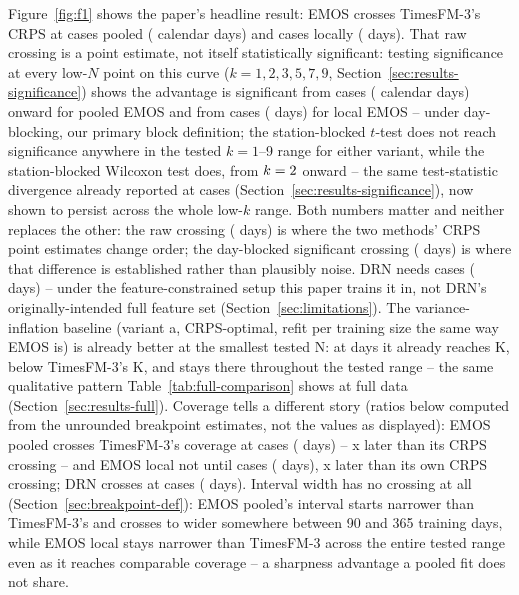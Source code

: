 Figure~\ref{fig:f1} shows the paper's headline result: EMOS crosses
TimesFM-3's CRPS at \BpCrpsPooledCases{} cases pooled
(\BpCrpsPooledDays{} calendar days) and \BpCrpsLocalCases{} cases locally
(\BpCrpsLocalDays{} days). That raw crossing is a point estimate, not
itself statistically significant: testing significance at every
low-\(N\) point on this curve (\(k=1,2,3,5,7,9\), Section~\ref{sec:results-significance})
shows the advantage is significant from \BpCrpsPooledSigK{} cases
(\BpCrpsPooledSigDays{} calendar days) onward for pooled EMOS and from
\BpCrpsLocalSigK{} cases (\BpCrpsLocalSigDays{} days) for local EMOS --
under day-blocking, our primary block definition; the station-blocked
\(t\)-test does not reach significance anywhere in the tested
\(k=1\)--9 range for either variant, while the station-blocked Wilcoxon
test does, from \(k=2{}\) onward --
the same test-statistic divergence already reported at \SigTestNCases{}
cases (Section~\ref{sec:results-significance}), now shown to persist
across the whole low-\(k\) range. Both numbers matter and neither
replaces the other: the raw crossing (\BpCrpsPooledDays{} days) is where
the two methods' CRPS point estimates change order; the day-blocked
significant crossing (\BpCrpsPooledSigDays{} days) is where that
difference is established rather than plausibly noise. DRN needs
\BpCrpsDrnCases{} cases (\BpCrpsDrnDays{} days) -- under the
feature-constrained setup this paper trains it in, not DRN's
originally-intended full feature set (Section~\ref{sec:limitations}).
The variance-inflation
baseline (variant a, CRPS-optimal, refit per training size the same way
EMOS is) is already better at the smallest tested N: at
\InflASmallestNDays{} days it already reaches \InflASmallestNCrps{} K,
below TimesFM-3's \CrpsTsfmFull{} K, and stays there throughout the
tested range -- the same qualitative pattern Table~\ref{tab:full-comparison}
shows at full data (Section~\ref{sec:results-full}). Coverage tells a
different story (ratios below computed from the unrounded breakpoint
estimates, not the values as displayed): EMOS pooled crosses TimesFM-3's
coverage at \BpCoveragePooledCases{} cases (\BpCoveragePooledDays{} days)
-- \CoverageCrpsRatioPooled{}x later than its CRPS crossing -- and EMOS
local not until \BpCoverageLocalCases{} cases (\BpCoverageLocalDays{}
days), \CoverageCrpsRatioLocal{}x later than its own CRPS crossing; DRN crosses
at \BpCoverageDrnCases{} cases (\BpCoverageDrnDays{} days). Interval width
has no crossing at all (Section~\ref{sec:breakpoint-def}): EMOS pooled's interval
starts narrower than TimesFM-3's and crosses to wider somewhere between
90 and 365 training days, while EMOS local stays narrower than TimesFM-3
across the entire tested range even as it reaches comparable coverage --
a sharpness advantage a pooled fit does not share.

